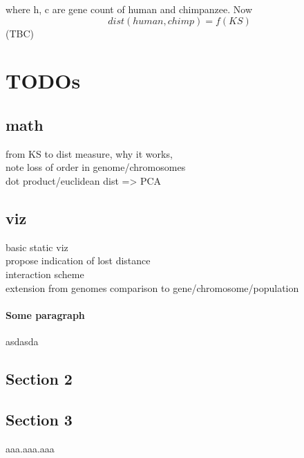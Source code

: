 \documentclass[12pt]{article}
\begin{document}
where h, c are gene count of human and chimpanzee. Now
$$dist(human, chimp) = f(KS)$$
(TBC)
\section{TODOs}
\subsection{math}
from KS to dist measure, why it works,\\
note loss of order in genome/chromosomes\\
dot product/euclidean dist => PCA\\
\subsection{viz}
basic static viz\\
propose indication of lost distance\\
interaction scheme\\

extension from genomes comparison to gene/chromosome/population\\


\paragraph{Some paragraph}
asdasda
\subsection{Section 2}
\subsection{Section 3}
aaa.aaa.aaa
\
\end{document}
